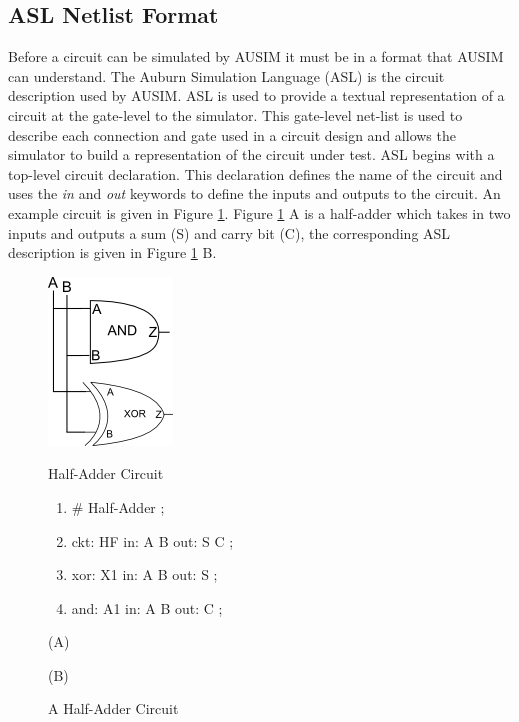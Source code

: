 \documentclass[12pt]{report}
\begin{document}
\subsection{ASL Netlist Format}
\label{sct:ASL}
Before a circuit can be simulated by AUSIM it must be in a format that AUSIM can understand.  The Auburn Simulation Language (ASL) is the circuit description used by AUSIM\cite{asl}.  ASL is used to provide a textual representation of a circuit at the gate-level to the simulator.  This gate-level net-list is used to describe each connection and gate used in a circuit design and allows the simulator to build a representation of the circuit under test.  ASL begins with a top-level circuit declaration.  This declaration defines the name of the circuit and uses the \textit{in} and \textit{out} keywords to define the inputs and outputs to the circuit\cite{asl}.  An example circuit is given in Figure \ref{fig:half_adder}.  Figure \ref{fig:half_adder} A is a half-adder which takes in two inputs and outputs a sum (S) and carry bit (C), the corresponding ASL description is given in Figure \ref{fig:half_adder} B.
\begin{figure}
	\begin{center}
		\begin{minipage}[l]{.45\textwidth}
			\includegraphics[scale=1]{images/half-adder}	
		\end{minipage}
		\begin{minipage}[r]{.45\textwidth}
			\begin{center}
				Half-Adder Circuit
			\end{center}
			\begin{enumerate}
				\setlength{\itemsep}{0cm}
				\item \# Half-Adder ;
				\item ckt: HF in: A B out: S C ;
				\item xor: X1 in: A B out: S ;
				\item and: A1 in: A B out: C ;
			\end{enumerate}
		\end{minipage}
	\end{center}
	\begin{center}
		\begin{minipage}[l]{.45\textwidth}
			(A)
		\end{minipage}
		\begin{minipage}[r]{.45\textwidth}
			(B)
		\end{minipage}
	\end{center}
	\caption{A Half-Adder Circuit}
	\label{fig:half_adder}
\end{figure}
\end{document}
